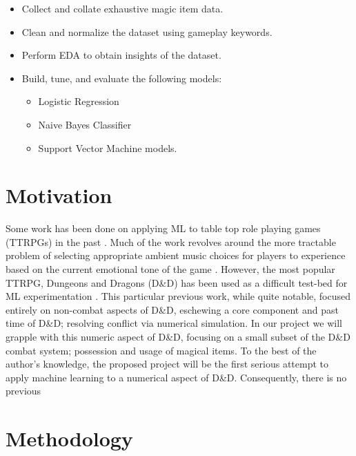 \documentclass[12pt]{diazessay}
\begin{document}
\begin{itemize}
	
	\item Collect and collate exhaustive magic item data.
	\item Clean and normalize the dataset using gameplay keywords.
	\item Perform EDA to obtain insights of the dataset.
	\item Build, tune, and evaluate the following models:
	\begin{itemize}
		\item Logistic Regression
		\item Naive Bayes Classifier
		\item Support Vector Machine models.
	\end{itemize}

\end{itemize}

\clearpage

\section*{Motivation}

Some work has been done on applying ML to table top role playing games (TTRPGs) in the past \cite{rameshkumar-bailey-2020-storytelling, macinnes2019d, cavanaugh2016machine, faria2019adaptive, riedl2013interactive}.
Much of the work revolves around the more tractable problem of selecting appropriate ambient music choices for players to experience based on the current emotional tone of the game \cite{ferreira2017mtg, risi2020increasing, padovani2017bardo, ferreira2020computer}.
However, the most popular TTRPG, Dungeons and Dragons (D\&D) has been used as a difficult test-bed for ML experimentation \cite{martin2018dungeons}.
This particular previous work, while quite notable, focused entirely on non-combat aspects of D\&D, eschewing a core component and past time of D\&D; resolving conflict via numerical simulation.
In our project we will grapple with this numeric aspect of D\&D, focusing on a small subset of the D\&D combat system; possession and usage of magical items.
To the best of the author's knowledge, the proposed project will be the first serious attempt to apply machine learning to a numerical aspect of D\&D.
Consequently, there is no previous 


\section*{Methodology}
\end{document}
